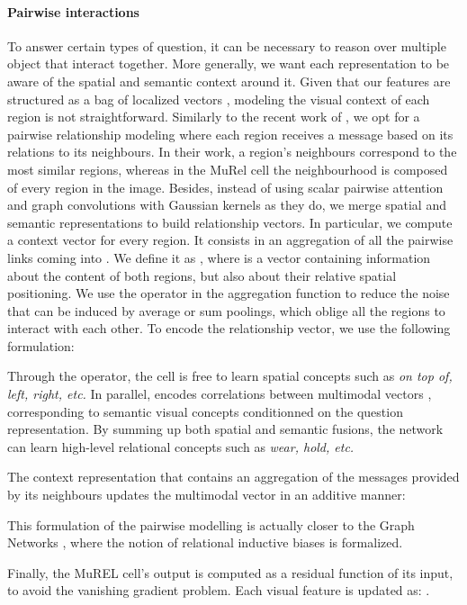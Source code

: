 \documentclass[10pt,twocolumn,letterpaper]{article}
\begin{document}
\paragraph{Pairwise interactions}
To answer certain types of question, it can be necessary to reason over multiple object that interact together. More generally, we want each representation to be aware of the spatial and semantic context around it.
Given that our features are structured as a bag of localized vectors \cite{Anderson_2018_CVPR}, modeling the visual context of each region is not straightforward. Similarly to the recent work of \cite{learningconditionedgraph}, we opt for a pairwise relationship modeling where each region receives a message based on its relations to its neighbours. 
In their work, a region's neighbours correspond to the  most similar regions, whereas in the MuRel cell the neighbourhood is composed of every region in the image.
Besides, instead of using scalar pairwise attention and graph convolutions with Gaussian kernels as they do, we merge spatial and semantic representations to build relationship vectors. 
In particular, we compute a context vector  for every region. It consists in an aggregation of all the pairwise links  coming into . 
We define it as , where  is a vector containing information about the content of both regions, but also about their relative spatial positioning.
We use the  operator in the aggregation function to reduce the noise that can be induced by average or sum poolings, which oblige all the regions to interact with each other.
To encode the relationship vector, we use the following formulation:



Through the  operator, the cell is free to learn spatial concepts such as \textit{on top of, left, right, etc.} In parallel,  encodes correlations between multimodal vectors , corresponding to semantic visual concepts conditionned on the question representation. By summing up both spatial and semantic fusions, the network can learn high-level relational concepts such as \textit{wear, hold, etc.}

The context representation  that contains an aggregation of the messages  provided by its neighbours updates the multimodal vector  in an additive manner:


This formulation of the pairwise modelling is actually closer to the Graph Networks \cite{DBLP:journals/corr/abs-1806-01261}, where the notion of relational inductive biases is formalized.

Finally, the MuREL cell's output is computed as a residual function of its input, to avoid the vanishing gradient problem. Each visual feature  is updated as: .
\end{document}
